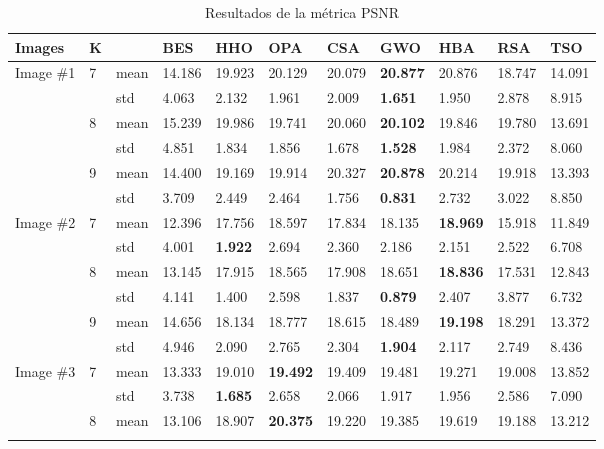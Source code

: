 \documentclass[conference]{IEEEtran}
\begin{document}
\begin{table}
\centering
\caption{Resultados de la métrica PSNR}
\begin{tabularx}{\textwidth}{|X|X|X|X|X|X|X|X|X|X|X|}
\hline
Images & K & & BES & HHO & OPA & CSA & GWO & HBA & RSA & TSO \\ \hline
\multirow{6}{*}{Image \#1} & \multirow{2}{*}{7} & mean & 14.186 & 19.923 & 20.129 & 20.079 & \textbf{20.877} & 20.876 & 18.747 & 14.091 \\ \cline{3-11} 
& & std & 4.063 & 2.132 & 1.961 & 2.009 & \textbf{1.651} & 1.950 & 2.878 & 8.915\\ \cline{2-11} 
& \multirow{2}{*}{8} & mean & 15.239 & 19.986 & 19.741 & 20.060 & \textbf{20.102} & 19.846 & 19.780 & 13.691 \\ \cline{3-11} 
& & std & 4.851 & 1.834 & 1.856 & 1.678 &\textbf{1.528} & 1.984 & 2.372 & 8.060 \\ \cline{2-11} 
& \multirow{2}{*}{9} & mean & 14.400 & 19.169 & 19.914 & 20.327 & \textbf{20.878} & 20.214 & 19.918 & 13.393\\ \cline{3-11} 
& & std &3.709 & 2.449 & 2.464 & 1.756 & \textbf{0.831} & 2.732 & 3.022 & 8.850\\ \hline
\multirow{6}{*}{Image \#2} & \multirow{2}{*}{7} & mean & 12.396 & 17.756 & 18.597 & 17.834 & 18.135 & \textbf{18.969} & 15.918 & 11.849 \\ \cline{3-11} 
& & std & 4.001 & \textbf{1.922} & 2.694 & 2.360 & 2.186 & 2.151 & 2.522 & 6.708\\ \cline{2-11} 
& \multirow{2}{*}{8} & mean & 13.145 & 17.915 & 18.565 & 17.908 & 18.651 & \textbf{18.836} & 17.531 & 12.843\\ \cline{3-11} 
& & std &4.141 & 1.400 & 2.598 & 1.837 & \textbf{0.879} & 2.407 & 3.877 & 6.732 \\ \cline{2-11} 
& \multirow{2}{*}{9} & mean & 14.656 & 18.134 & 18.777 & 18.615 & 18.489 & \textbf{19.198} & 18.291 & 13.372 \\ \cline{3-11} 
& & std & 4.946 & 2.090 & 2.765 & 2.304 & \textbf{1.904} & 2.117 & 2.749 & 8.436\\ \hline
\multirow{6}{*}{Image \#3} & \multirow{2}{*}{7} & mean & 13.333 & 19.010 & \textbf{19.492} & 19.409 & 19.481 & 19.271 & 19.008 & 13.852 \\ \cline{3-11} 
& & std &3.738 & \textbf{1.685} & 2.658 & 2.066 & 1.917 & 1.956 & 2.586 & 7.090\\ \cline{2-11} 
& \multirow{2}{*}{8} & mean & 13.106 & 18.907 & \textbf{20.375} & 19.220 & 19.385 & 19.619 & 19.188 & 13.212\\ \cline{3-11} 

\end{tabularx}
\end{table}
\end{document}
